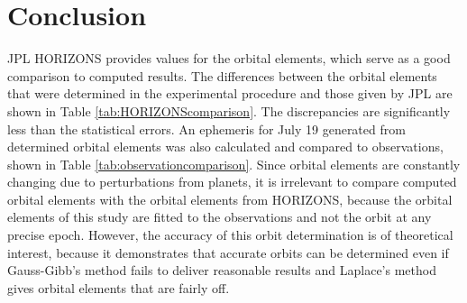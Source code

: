 \documentclass[12pt,journal,compsoc]{IEEEtran}
\begin{document}
\section{Conclusion}
JPL HORIZONS provides values for the orbital elements, which serve as a good comparison to computed results.
The differences between the orbital elements that were determined in the experimental procedure and those given by JPL 
are shown in Table \ref{tab:HORIZONScomparison}.
The discrepancies are significantly less than the statistical errors. 
An ephemeris for July 19 generated from determined orbital elements was also calculated and compared to observations, 
shown in Table \ref{tab:observationcomparison}.
Since orbital elements are constantly changing due to perturbations from planets,
it is irrelevant to compare computed orbital elements with the 
orbital elements from HORIZONS, because the orbital elements of this study 
are fitted to the observations and not the orbit at any precise epoch.
However, the accuracy of this orbit determination is of theoretical interest, because 
it demonstrates that accurate orbits can be determined even if Gauss-Gibb's method fails to 
deliver reasonable results and Laplace's method gives orbital elements that are fairly off.

\end{document}
